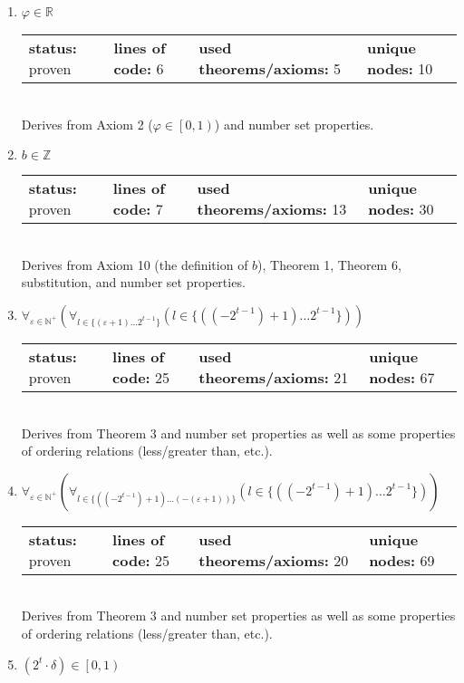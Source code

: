 \documentclass{article}[12pt]
\begin{document}
\begin{enumerate}
\item $\varphi \in \mathbb{R}$ \hfill \\
  \begin{tabular}{l | l | l | l}
    \textbf{status:} proven & \textbf{lines of code:} 6 & \textbf{used theorems/axioms:} 5 & \textbf{unique nodes:} 10
  \end{tabular} \hfill \\
  Derives from Axiom 2 ($\varphi \in \left[0,1\right)$) and number set properties.
\item $b \in \mathbb{Z}$ \hfill \\
  \begin{tabular}{l | l | l | l}
    \textbf{status:} proven & \textbf{lines of code:} 7 & \textbf{used theorems/axioms:} 13 & \textbf{unique nodes:} 30
  \end{tabular} \hfill \\
  Derives from Axiom 10 (the definition of $b$), Theorem 1, Theorem 6, substitution, and number set properties.
\item $\forall_{\varepsilon \in \mathbb{N}^+} \left(\forall_{l \in \{\left(\varepsilon + 1\right)\ldots 2^{t - 1}\}} \left(l \in \{\left(\left(-2^{t - 1}\right) + 1\right)\ldots 2^{t - 1}\}\right)\right)$ \hfill \\
  \begin{tabular}{l | l | l | l}
    \textbf{status:} proven & \textbf{lines of code:} 25 & \textbf{used theorems/axioms:} 21 & \textbf{unique nodes:} 67
  \end{tabular} \hfill \\
Derives from Theorem 3 and number set properties as well as some properties of ordering relations (less/greater than, etc.).
\item $\forall_{\varepsilon \in \mathbb{N}^+} \left(\forall_{l \in \{\left(\left(-2^{t - 1}\right) + 1\right)\ldots \left(-\left(\varepsilon + 1\right)\right)\}} \left(l \in \{\left(\left(-2^{t - 1}\right) + 1\right)\ldots 2^{t - 1}\}\right)\right)$ \hfill \\
  \begin{tabular}{l | l | l | l}
    \textbf{status:} proven & \textbf{lines of code:} 25 & \textbf{used theorems/axioms:} 20 & \textbf{unique nodes:} 69
  \end{tabular} \hfill \\
Derives from Theorem 3 and number set properties as well as some properties of ordering relations (less/greater than, etc.).
\item $\left(2^{t} \cdot \delta\right) \in \left[0,1\right)$ \hfill \\

\end{enumerate}
\end{document}
